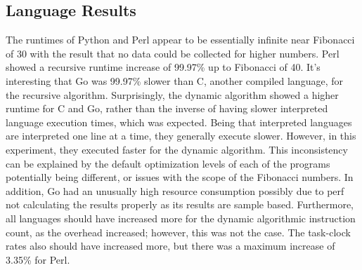 \documentclass{sig-alternate}
\begin{document}
\subsection{Language Results}
The runtimes of Python and Perl appear to be essentially infinite near Fibonacci of 30 with the result that no data could be collected for higher numbers. Perl showed a recursive runtime increase of 99.97\% up to Fibonacci of 40. It’s interesting that Go was 99.97\% slower than C, another compiled language, for the recursive algorithm. Surprisingly, the dynamic algorithm showed a higher runtime for C and Go, rather than the inverse of having slower interpreted language execution times, which was expected. Being that interpreted languages are interpreted one line at a time, they generally execute slower. However, in this experiment, they executed faster for the dynamic algorithm. This inconsistency can be explained by the default optimization levels of each of the programs potentially being different, or issues with the scope of the Fibonacci numbers. In addition, Go had an unusually high resource consumption possibly due to perf not calculating the results properly as its results are sample based. Furthermore, all languages should have increased more for the dynamic algorithmic instruction count, as the overhead increased; however, this was not the case. The task-clock rates also should have increased more, but there was a maximum increase of 3.35\% for Perl.
\end{document}
